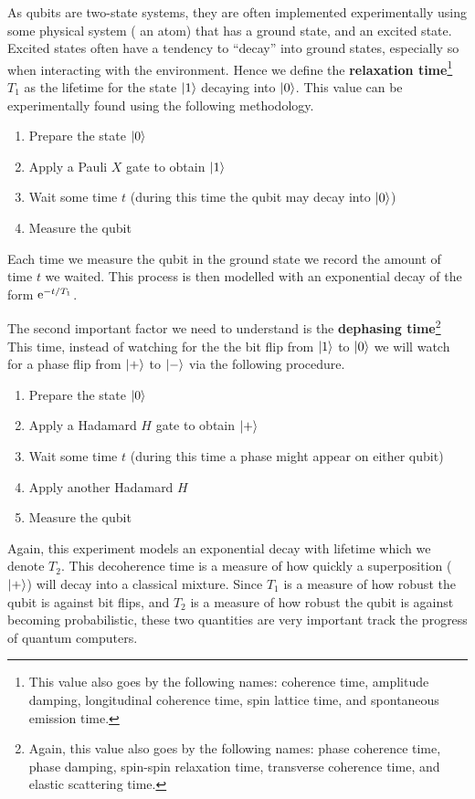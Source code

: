 As qubits are two-state systems, they are often implemented experimentally using some physical system (\eg{} an atom) that has a ground state, and an excited state.
Excited states often have a tendency to ``decay'' into ground states, especially so when interacting with the environment.
Hence we define the \textbf{relaxation time}\footnote{This value also goes by the following names: coherence time, amplitude damping, longitudinal coherence time, spin lattice time, and spontaneous emission time.} $T_1$ as the lifetime for the state $\ket{1}$ decaying into $\ket{0}$.
This value can be experimentally found using the following methodology.
\begin{enumerate}
    \item Prepare the state $\ket{0}$
    \item Apply a Pauli $X$ gate to obtain $\ket{1}$
    \item Wait some time $t$ (during this time the qubit may decay into $\ket{0}$)
    \item Measure the qubit
\end{enumerate}
Each time we measure the qubit in the ground state we record the amount of time $t$ we waited.
This process is then modelled with an exponential decay of the form $\mathrm{e}^{-t/T_1}$.

The second important factor we need to understand is the \textbf{dephasing time}\footnote{Again, this value also goes by the following names: phase coherence time, phase damping, spin-spin relaxation time, transverse coherence time, and elastic scattering time.}
This time, instead of watching for the the bit flip from $\ket{1}$ to $\ket{0}$ we will watch for a phase flip from $\ket{+}$ to $\ket{-}$ via the following procedure.
\begin{enumerate}
    \item Prepare the state $\ket{0}$
    \item Apply a Hadamard $H$ gate to obtain $\ket{+}$
    \item Wait some time $t$ (during this time a phase might appear on either qubit)
    \item Apply another Hadamard $H$
    \item Measure the qubit
\end{enumerate}
Again, this experiment models an exponential decay with lifetime which we denote $T_2$.
This decoherence time is a measure of how quickly a superposition ($\ket{+}$) will decay into a classical mixture.
Since $T_1$ is a measure of how robust the qubit is against bit flips, and $T_2$ is a measure of how robust the qubit is against becoming probabilistic, these two quantities are very important track the progress of quantum computers.

